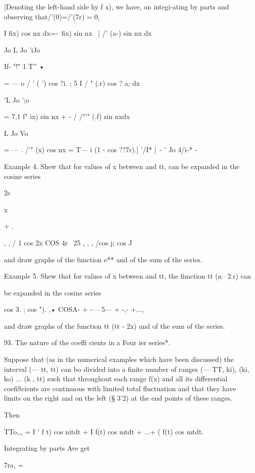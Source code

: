 [Denoting the left-hand side hy f x), we have, on integi-ating by
parts and observing that/'(0)=/'(7r) = 0,

I fix) cos nx dx=-\ fix) sin nx \ | /' (a-) sin nx dx

Jo L Jo 'iJo

If- "!" 1 T'' •

= — o / ' ( ') cos ?i. ; 5 I / " (.r) cos ? a; dx

 'L Jo ';o

= 7,1 f" ix) sin nx + - / /"'" (.f) sin nxdx

  L Jo Vo

= — . /'" (x) cos nx = T— i (1 - cos ??7r).] '/I* |\ - ' Jo 4/i-* -

Example 4. Shew that for values of x between and tt, can be expanded
in the cosine series



2s



 x



+ .



, , / 1 cos 2x COS 4r \ 25 , , , /cos j; cos J

and draw graphs of the function e** and of the sum of the series.

Example 5. Shew that for values of x between and tt, the fimction tt
(n-- 2.r) can

be expanded in the cosine series

cos 3. ; cos "). ,• COSA- + -— 5— + -,- +...,

and draw graphs of the function tt (tt - 2x) and of the sum of the
series.

93. The nature of the coeffi cients in a Four ier series*.

Suppose that (as in the numerical examples which have been discussed)
the interval (— tt, tt) can bo divided into a finite number of ranges
(— TT, ki), (ki, ko) ... (k , tt) such that throughout each range f(x)
and all its differential coefiScients are continuous with limited
total fluctuation and that they have limits on the right and on the
left (§ 3'2) at the end points of these ranges.

Then

TTo,,, = I ' f t) cos nitdt + I f(t) cos mtdt + ...+ ( f(t) cos mtdt.

Integrating by parts Ave get



7ra, =



